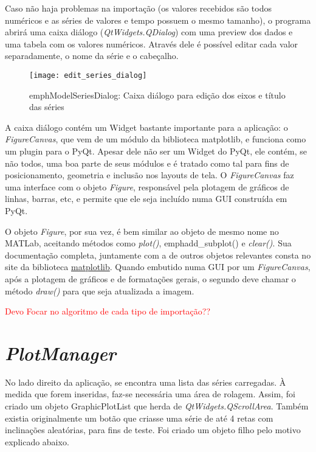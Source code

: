 Caso não haja problemas na importação (os valores recebidos são todos numéricos e as séries de valores e tempo possuem o mesmo tamanho), o programa abrirá uma caixa diálogo (\emph{QtWidgets.QDialog}) com uma preview dos dados e uma tabela com os valores numéricos. Através dele é possível editar cada valor separadamente, o nome da série e o cabeçalho.

\begin{figure}
	\centering
	\texttt{[image: edit\_series\_dialog]}
	\caption{emph{ModelSeriesDialog}: Caixa diálogo para edição dos eixos e título das séries}
	\label{img_edit_series_dialog}
\end{figure}

A caixa diálogo contém um Widget bastante importante para a aplicação: o \emph{FigureCanvas}, que vem de um módulo da biblioteca matplotlib, e funciona como um plugin para o PyQt. Apesar dele não ser um Widget do PyQt, ele contém, se não todos, uma boa parte de seus módulos e é tratado como tal para fins de posicionamento, geometria e inclusão nos layouts de tela. O \emph{FigureCanvas} faz uma interface com o objeto \emph{Figure}, responsável pela plotagem de gráficos de linhas, barras, etc, e permite que ele seja incluído numa GUI construída em PyQt.

O objeto \emph{Figure}, por sua vez, é bem similar ao objeto de mesmo nome no MATLab, aceitando métodos como \emph{plot()}, emph{add\_subplot()} e \emph{clear()}. Sua documentação completa, juntamente com a de outros objetos relevantes consta no site da biblioteca \href{https://matplotlib.org/}{matplotlib}. Quando embutido numa GUI por um \emph{FigureCanvas}, após a plotagem de gráficos e de formatações gerais, o segundo deve chamar o método \emph{draw()} para que seja atualizada a imagem.

\textcolor{red}{Devo Focar no algoritmo de cada tipo de importação??}

\section{\emph{PlotManager}}

No lado direito da aplicação, se encontra uma lista das séries carregadas. À medida que forem inseridas, faz-se necessária uma área de rolagem. Assim, foi criado um objeto GraphicPlotList que herda de \emph{QtWidgets.QScrollArea}. Também existia originalmente um botão que criasse uma série de até 4 retas com inclinações aleatórias, para fins de teste. Foi criado um objeto filho pelo motivo explicado abaixo.

